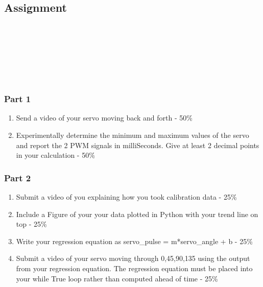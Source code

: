 \subsection{Assignment}


\ \\
\ \\
\ \\
\ \\

\ \\
\subsubsection{Part 1}
\begin{enumerate}[itemsep=-5pt]
\item Send a video of your servo moving back and forth - 50\%
\item Experimentally determine the minimum and maximum values of the servo and report the 2 PWM signals in milliSeconds. Give at least 2 decimal points in your calculation - 50\%
\end{enumerate}
\subsubsection{Part 2}
\begin{enumerate}[itemsep=-5pt]
\item Submit a video of you explaining how you took calibration data - 25\%
\item Include a Figure of your your data plotted in Python with your trend line on top - 25\%
\item Write your regression equation as servo\_pulse = m*servo\_angle + b - 25\%
\item Submit a video of your servo moving through 0,45,90,135 using the output from your regression equation. The regression equation must be placed into your while True loop rather than computed ahead of time -  25\% 
\end{enumerate}
